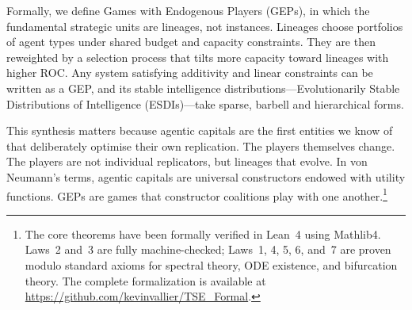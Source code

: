 \documentclass[12pt]{article}
\begin{document}
Formally, we define Games with Endogenous Players (GEPs), in which the fundamental strategic units are lineages, not instances. Lineages choose portfolios of agent types under shared budget and capacity constraints. They are then reweighted by a selection process that tilts more capacity toward lineages with higher ROC. Any system satisfying additivity and linear constraints can be written as a GEP, and its stable intelligence distributions---Evolutionarily Stable Distributions of Intelligence (ESDIs)---take sparse, barbell and hierarchical forms.

This synthesis matters because agentic capitals are the first entities we know of that deliberately optimise their own replication. The players themselves change. The players are not individual replicators, but lineages that evolve. In von Neumann's terms, agentic capitals are universal constructors endowed with utility functions. GEPs are games that constructor coalitions play with one another.\footnote{The core theorems have been formally verified in Lean~4 using Mathlib4. Laws~2 and~3 are fully machine-checked; Laws~1, 4, 5, 6, and~7 are proven modulo standard axioms for spectral theory, ODE existence, and bifurcation theory. The complete formalization is available at \url{https://github.com/kevinvallier/TSE_Formal}.}
\end{document}

